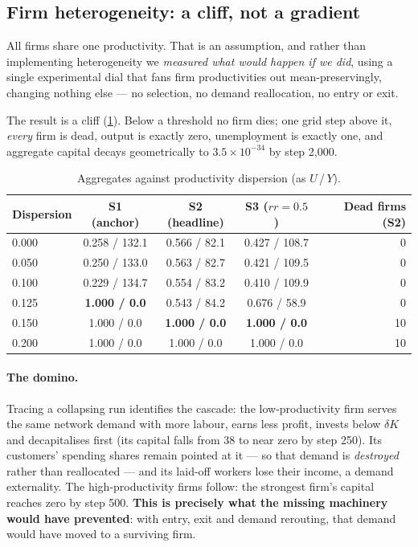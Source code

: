 \subsection{Firm heterogeneity: a cliff, not a gradient}
\label{sec:heterogeneity}

All firms share one productivity. That is an assumption, and rather than
implementing heterogeneity we \emph{measured what would happen if we did},
using a single experimental dial that fans firm productivities out
mean-preservingly, changing nothing else --- no selection, no demand
reallocation, no entry or exit.

The result is a cliff (\cref{tab:heterogeneity}). Below a threshold no firm
dies; one grid step above it, \emph{every} firm is dead, output is exactly
zero, unemployment is exactly one, and aggregate capital decays geometrically
to $3.5\times10^{-34}$ by step 2{,}000.

\begin{table}[htbp]
\centering
\small
\caption{Aggregates against productivity dispersion (as $U$\,/\,$Y$).}
\label{tab:heterogeneity}
\begin{tabular}{lcccr}
\toprule
Dispersion & S1 (anchor) & S2 (headline) & S3 ($rr = 0.5$) & Dead firms (S2)\\
\midrule
0.000 & 0.258 / 132.1 & 0.566 / 82.1 & 0.427 / 108.7 & 0\\
0.050 & 0.250 / 133.0 & 0.563 / 82.7 & 0.421 / 109.5 & 0\\
0.100 & 0.229 / 134.7 & 0.554 / 83.2 & 0.410 / 109.9 & 0\\
0.125 & \textbf{1.000 / 0.0} & 0.543 / 84.2 & 0.676 / 58.9 & 0\\
0.150 & 1.000 / 0.0 & \textbf{1.000 / 0.0} & \textbf{1.000 / 0.0} & 10\\
0.200 & 1.000 / 0.0 & 1.000 / 0.0 & 1.000 / 0.0 & 10\\
\bottomrule
\end{tabular}
\end{table}

\paragraph{The domino.} Tracing a collapsing run identifies the cascade: the
low-productivity firm serves the same network demand with more labour, earns
less profit, invests below $\delta K$ and decapitalises first (its capital
falls from 38 to near zero by step 250). Its customers' spending shares remain
pointed at it --- so that demand is \emph{destroyed} rather than reallocated
--- and its laid-off workers lose their income, a demand externality. The
high-productivity firms follow: the strongest firm's capital reaches zero by
step 500. \textbf{This is precisely what the missing machinery would have
prevented}: with entry, exit and demand rerouting, that demand would have moved
to a surviving firm.

